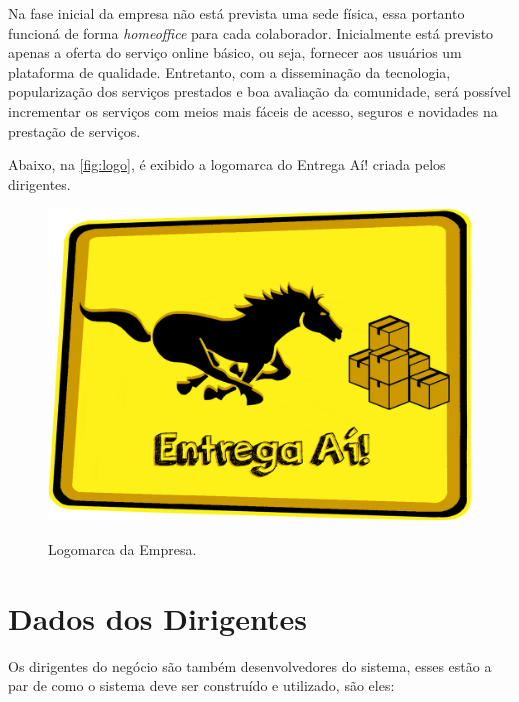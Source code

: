 		Na fase inicial da empresa não está prevista uma sede física, essa portanto funcioná de forma \textit{homeoffice} para cada colaborador. Inicialmente está previsto apenas a oferta do serviço online básico, ou seja, fornecer aos usuários um plataforma de qualidade. Entretanto, com a disseminação da tecnologia, popularização dos serviços prestados e boa avaliação da comunidade, será possível incrementar os serviços com meios mais fáceis de acesso, seguros e novidades na prestação de serviços.
        
        Abaixo, na \autoref{fig:logo}, é exibido a logomarca do Entrega Aí! criada pelos dirigentes.
        
        
		\begin{figure}[H]
			\centering
   			\caption{Logomarca da Empresa.}
			\includegraphics[width=0.8\linewidth]{img/logoEntregaAi.png}
			\label{fig:logo}
		\end{figure}
		
	\section{Dados dos Dirigentes} \label{sec:dirigentes}
	
		Os dirigentes do negócio são também desenvolvedores do sistema, esses estão a par de como o sistema deve ser construído e utilizado, são eles:
		
